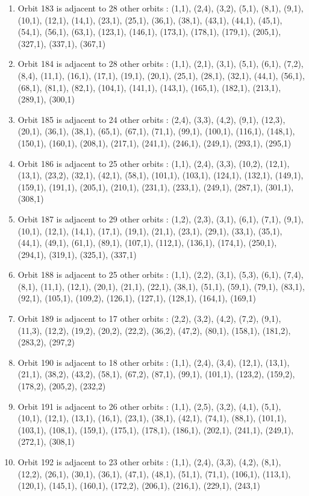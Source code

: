 \documentclass[12pt]{article}
\begin{document}
\begin{enumerate}
\item Orbit 183 is adjacent to 28 other orbits : (1,1), (2,4), (3,2), (5,1), (8,1), (9,1), (10,1), (12,1), (14,1), (23,1), (25,1), (36,1), (38,1), (43,1), (44,1), (45,1), (54,1), (56,1), (63,1), (123,1), (146,1), (173,1), (178,1), (179,1), (205,1), (327,1), (337,1), (367,1)
\item Orbit 184 is adjacent to 28 other orbits : (1,1), (2,1), (3,1), (5,1), (6,1), (7,2), (8,4), (11,1), (16,1), (17,1), (19,1), (20,1), (25,1), (28,1), (32,1), (44,1), (56,1), (68,1), (81,1), (82,1), (104,1), (141,1), (143,1), (165,1), (182,1), (213,1), (289,1), (300,1)
\item Orbit 185 is adjacent to 24 other orbits : (2,4), (3,3), (4,2), (9,1), (12,3), (20,1), (36,1), (38,1), (65,1), (67,1), (71,1), (99,1), (100,1), (116,1), (148,1), (150,1), (160,1), (208,1), (217,1), (241,1), (246,1), (249,1), (293,1), (295,1)
\item Orbit 186 is adjacent to 25 other orbits : (1,1), (2,4), (3,3), (10,2), (12,1), (13,1), (23,2), (32,1), (42,1), (58,1), (101,1), (103,1), (124,1), (132,1), (149,1), (159,1), (191,1), (205,1), (210,1), (231,1), (233,1), (249,1), (287,1), (301,1), (308,1)
\item Orbit 187 is adjacent to 29 other orbits : (1,2), (2,3), (3,1), (6,1), (7,1), (9,1), (10,1), (12,1), (14,1), (17,1), (19,1), (21,1), (23,1), (29,1), (33,1), (35,1), (44,1), (49,1), (61,1), (89,1), (107,1), (112,1), (136,1), (174,1), (250,1), (294,1), (319,1), (325,1), (337,1)
\item Orbit 188 is adjacent to 25 other orbits : (1,1), (2,2), (3,1), (5,3), (6,1), (7,4), (8,1), (11,1), (12,1), (20,1), (21,1), (22,1), (38,1), (51,1), (59,1), (79,1), (83,1), (92,1), (105,1), (109,2), (126,1), (127,1), (128,1), (164,1), (169,1)
\item Orbit 189 is adjacent to 17 other orbits : (2,2), (3,2), (4,2), (7,2), (9,1), (11,3), (12,2), (19,2), (20,2), (22,2), (36,2), (47,2), (80,1), (158,1), (181,2), (283,2), (297,2)
\item Orbit 190 is adjacent to 18 other orbits : (1,1), (2,4), (3,4), (12,1), (13,1), (21,1), (38,2), (43,2), (58,1), (67,2), (87,1), (99,1), (101,1), (123,2), (159,2), (178,2), (205,2), (232,2)
\item Orbit 191 is adjacent to 26 other orbits : (1,1), (2,5), (3,2), (4,1), (5,1), (10,1), (12,1), (13,1), (16,1), (23,1), (38,1), (42,1), (74,1), (88,1), (101,1), (103,1), (108,1), (159,1), (175,1), (178,1), (186,1), (202,1), (241,1), (249,1), (272,1), (308,1)
\item Orbit 192 is adjacent to 23 other orbits : (1,1), (2,4), (3,3), (4,2), (8,1), (12,2), (26,1), (30,1), (36,1), (47,1), (48,1), (51,1), (71,1), (106,1), (113,1), (120,1), (145,1), (160,1), (172,2), (206,1), (216,1), (229,1), (243,1)

\end{enumerate}
\end{document}
